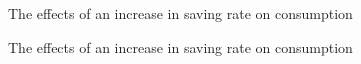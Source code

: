 \documentclass[12pt]{article} %
\begin{document}
\begin{figure}[H] %
	\caption{\small The effects of an increase in saving rate on consumption}
	\label{fig:speciation}
\end{figure}


\begin{figure}[H] %
	\caption{\small The effects of an increase in saving rate on consumption}
	\label{fig:speciation}
\end{figure}
\end{document}
